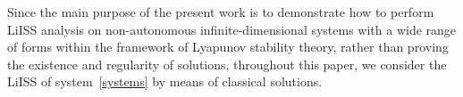 \documentclass[onecolumn]{autart}
\newtheorem{definition}{Definition}
\newenvironment{proof of Prop.ODE}{{\it Proof of Proposition~\ref{Prop.ODE}:\enspace}}{\hfill $\blacksquare$\par}
\newenvironment{proof of PDE}{{\it Proof of Proposition \ref{Prop.8}:\enspace}}{\hfill $\blacksquare$\par}
\begin{document}
{	Since the main purpose of the present work is to demonstrate how to perform LiISS analysis on non-autonomous infinite-dimensional systems with a wide range of forms within the framework of Lyapunov stability theory, rather than proving the existence and regularity of solutions,  throughout this paper, we  consider the LiISS  of system~\eqref{systems} by means of classical solutions.

}
\end{document}
